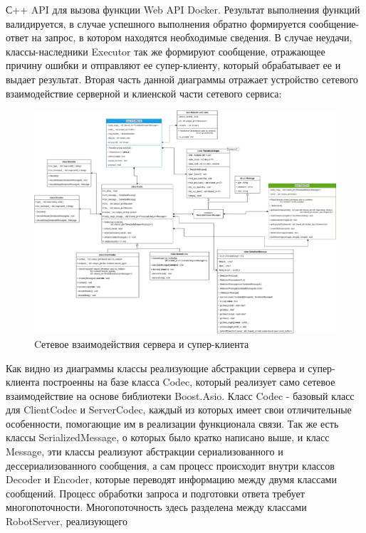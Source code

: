 \documentclass[a4paper, 14pt]{extreport}
\begin{document}
С++ API для вызова функции Web API Docker. Результат выполнения функций валидируется, в случае успешного выполнения обратно 
формируется сообщение-ответ на запрос, в котором находятся необходимые сведения. В случае неудачи, классы-наследники Executor 
так же формируют сообщение, отражающее причину ошибки и отправляют ее супер-клиенту, который обрабатывает ее и выдает результат.
Вторая часть данной диаграммы отражает устройство сетевого взаимодействие серверной и клиенской части сетевого сервиса:
\newpage
\begin{figure}[ht]
\begin{center}
\includegraphics[scale = 0.265]{./figure/client-serv-comm}
\caption{Cетевое взаимодействия сервера и супер-клиента}
\label{fig:manip_photo}
\end{center}
\end{figure}
\par Как видно из диаграммы классы реализующие абстракции сервера и супер-клиента построенны на базе класса Codec, который реализует 
само сетевое взаимодействие на основе библиотеки Boost.Asio. Класс Codec - базовый класс для ClientCodec и ServerCodec, каждый из 
которых имеет свои отличительные особенности, помогающие им в реализации функционала связи. Так же есть классы SerializedMessage, о 
которых было кратко написано выше, и класс Message, эти классы реализуют абстракции сериализованного и дессериализованного сообщения,
а сам процесс происходит внутри классов Decoder и Encoder, которые переводят информацию между двумя классами сообщений. Процесс обработки 
запроса и подготовки ответа требует многопоточности. Многопоточность здесь разделена между классами RobotServer, реализующего 
\end{document}
